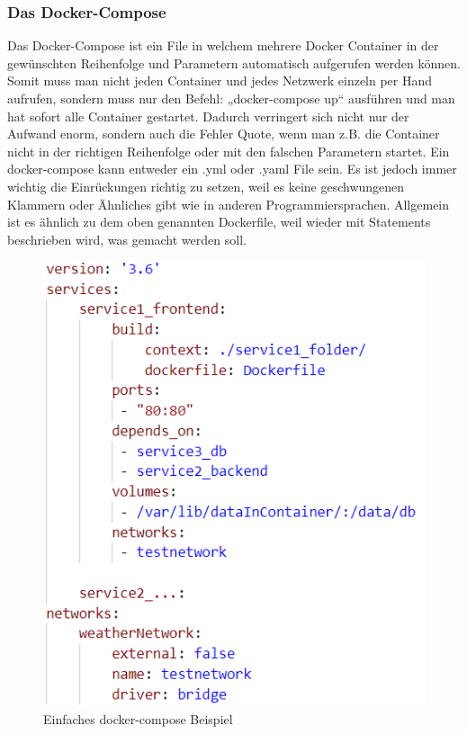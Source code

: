 \subsubsection{Das Docker-Compose}\label{ssec:Docker-Compose}
Das Docker-Compose ist ein File in welchem mehrere Docker Container in der gewünschten Reihenfolge und Parametern automatisch aufgerufen werden können. Somit muss man nicht jeden Container und jedes Netzwerk einzeln per Hand aufrufen, sondern muss nur den Befehl: „docker-compose up“ ausführen und man hat sofort alle Container gestartet. Dadurch verringert sich nicht nur der Aufwand enorm, sondern auch die Fehler Quote, wenn man z.B. die Container nicht in der richtigen Reihenfolge oder mit den falschen Parametern startet.
Ein docker-compose kann entweder ein .yml oder .yaml File sein. Es ist jedoch immer wichtig die Einrückungen richtig zu setzen, weil es keine geschwungenen Klammern oder Ähnliches gibt wie in anderen Programmiersprachen. Allgemein ist es ähnlich zu dem oben genannten Dockerfile, weil wieder mit Statements beschrieben wird, was gemacht werden soll. 
\begin{figure}[H]
    \includegraphics{images/docker-compose_example.PNG}
    \caption{Einfaches docker-compose Beispiel}
    \label{img:docker-compose_example}
\end{figure}

